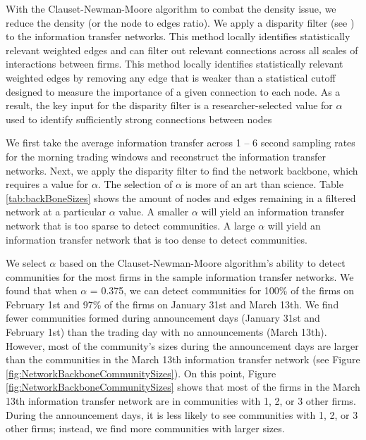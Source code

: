 With the Clauset-Newman-Moore algorithm to combat the density issue,  we reduce the density (or the node to edges ratio).  We apply a disparity filter (see \cite{Serrano}) to the information transfer networks.  This method locally identifies statistically relevant weighted edges and can filter out relevant connections across all scales of interactions between firms.  This method locally identifies statistically relevant weighted edges by removing any edge that is weaker than a statistical cutoff designed to measure the importance of a given connection to each node.  As a result, the key input for the disparity filter is a researcher-selected value for \(\alpha \) used to identify sufficiently strong connections between nodes

We first take the average information transfer across 1 – 6 second sampling rates for the morning trading windows and reconstruct the information transfer networks.  Next, we apply the disparity filter to find the network backbone, which requires a value for \(\alpha\). The selection of \(\alpha\) is more of an art than science.  Table \ref{tab:backBoneSizes} shows the amount of nodes and edges remaining in a filtered network at a particular  \(\alpha\) value.  A smaller \(\alpha\) will yield an information transfer network that is too sparse to detect communities. A large \(\alpha\) will yield an information transfer network that is too dense to detect communities. 

We select \(\alpha\) based on the Clauset-Newman-Moore algorithm’s ability to detect communities for the most firms in the sample information transfer networks.  We found that when \(\alpha\) = 0.375,  we can detect communities for 100\% of the firms on February 1st and 97\% of the firms on January 31st and March 13th.  We find fewer communities formed during announcement days (January 31st and February 1st) than the trading day with no announcements (March 13th).  However,  most of the community’s sizes during the announcement days are larger than the communities in the March 13th information transfer network (see Figure \ref{fig:NetworkBackboneCommunitySizes}).  On this point,  Figure \ref{fig:NetworkBackboneCommunitySizes} shows that most of the firms in the March 13th information transfer network are in communities with 1, 2, or 3 other firms. During the announcement days, it is less likely to see communities with 1, 2, or 3 other firms; instead, we find more communities with larger sizes.

